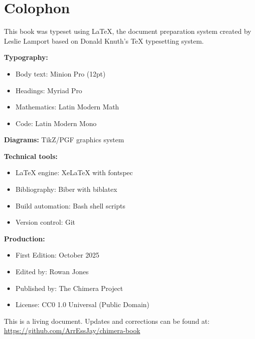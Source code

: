 \documentclass[11pt,oneside]{book}
\begin{document}


\backmatter

\backmatter

\printbibliography[heading=bibintoc,title={Bibliography}]



\printindex

\chapter*{Colophon}

This book was typeset using \LaTeX{}, the document preparation system created by Leslie Lamport based on Donald Knuth's \TeX{} typesetting system.

\textbf{Typography:}
\begin{itemize}
\item Body text: Minion Pro (12pt)
\item Headings: Myriad Pro
\item Mathematics: Latin Modern Math
\item Code: Latin Modern Mono
\end{itemize}

\textbf{Diagrams:} TikZ/PGF graphics system

\textbf{Technical tools:}
\begin{itemize}
\item \LaTeX{} engine: Xe\LaTeX{} with fontspec
\item Bibliography: Biber with biblatex
\item Build automation: Bash shell scripts
\item Version control: Git
\end{itemize}

\textbf{Production:}
\begin{itemize}
\item First Edition: October 2025
\item Edited by: Rowan Jones
\item Published by: The Chimera Project
\item License: CC0 1.0 Universal (Public Domain)
\end{itemize}

This is a living document. Updates and corrections can be found at:\\
\url{https://github.com/ArrEssJay/chimera-book}

\newpage
\thispagestyle{empty}

\end{document}
